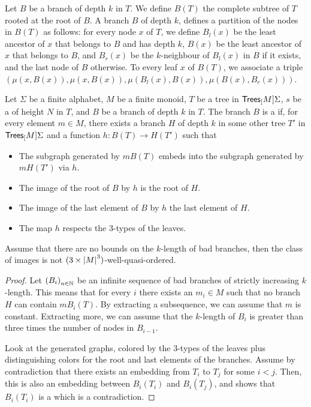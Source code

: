 \AP Let $B$ be a branch of depth $k$ in $T$. We define $B(T)$ the complete
subtree of $T$ rooted at the root of $B$. A branch $B$ of depth $k$, defines a
partition of the nodes in $B(T)$ as follows: for every node $x$ of $T$, we
define $B_l(x)$ be the least ancestor of $x$ that belongs to $B$ and has depth
$k$, $B(x)$ be the least ancestor of $x$ that belongs to $B$, and $B_r(x)$ be
the $k$-neighbour of $B_l(x)$ in $B$ if it exists, and the last node of $B$
otherwise. To every leaf $x$ of $B(T)$, we associate a triple $(\mu(x, B(x)),
\mu(x,B(x)), \mu(B_l(x), B(x)), \mu(B(x), B_r(x)))$.

\begin{definition}
    \label{good-branch:def}
    Let $\Sigma$ be a finite alphabet, $M$ be a finite monoid, 
    $T$ be a tree in $\mathsf{Trees}_{[}M]{\Sigma}$, $s$ be a 
     of height $N$ in $T$,
    and $B$ be a branch of depth $k$ in $T$.
    The branch $B$ is a  if, for every element $m \in M$,
    there exists a branch $H$ of depth $k$ in some other tree $T'$ in $\mathsf{Trees}_{[}M]{\Sigma}$
    and a function $h \colon B(T) \to H(T')$ such that
    \begin{itemize}
        \item The subgraph generated by $m B(T)$ embeds into the subgraph generated by $m H(T')$ via $h$.
        \item The image of the root of $B$ by $h$ is the root of $H$.
        \item The image of the last element of $B$ by $h$ the last element of $H$.
        \item The map $h$ respects the $3$-types of the leaves.
    \end{itemize}
\end{definition}

\begin{lemma}
    Assume that there are no bounds on the $k$-length of bad branches, then 
    the class of images is not $(3 \times \left| M \right|^3)$-well-quasi-ordered.
\end{lemma}
\begin{proof}
    Let $\seqof{B_i}$ be an infinite sequence of bad branches of strictly increasing $k$-length.
    This means that for every $i$ there exists an $m_i \in M$ such that
    no branch $H$ can contain $m B_i(T)$. By extracting a subsequence, we can assume that $m$ is constant.
    Extracting more, we can assume that the $k$-length of $B_i$ is greater than three times the
    number of nodes in $B_{i-1}$.

    Look at the generated graphs, colored by the $3$-types of the leaves plus
    distinguishing colors for the root and last elements of the branches. Assume by contradiction that
    there exists an embedding from $T_i$ to $T_j$ for some $i < j$. Then,
    this is also an embedding between $B_i(T_i)$ and $B_i(T_j)$, and
    shows that $B_i(T_i)$ is a  which is a contradiction.
\end{proof}

